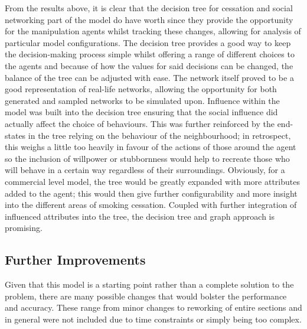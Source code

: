 \documentclass[]{report}
\begin{document}
From the results above, it is clear that the decision tree for cessation and social networking part of the model do have worth since they provide the opportunity for the manipulation agents whilst tracking these changes, allowing for analysis of particular model configurations. The decision tree provides a good way to keep the decision-making process simple whilst offering a range of different choices to the agents and because of how the values for said decisions can be changed, the balance of the tree can be adjusted with ease. The network itself proved to be a good representation of real-life networks, allowing the opportunity for both generated and sampled networks to be simulated upon. Influence within the model was built into the decision tree ensuring that the social influence did actually affect the choice of behaviours. This was further reinforced by the end-states in the tree relying on the behaviour of the neighbourhood; in retrospect, this weighs a little too heavily in favour of the actions of those around the agent so the inclusion of willpower or stubbornness would help to recreate those who will behave in a certain way regardless of their surroundings. Obviously, for a commercial level model, the tree would be greatly expanded with more attributes added to the agent; this would then give further configurability and more insight into the different areas of smoking cessation. Coupled with further integration of influenced attributes into the tree, the decision tree and graph approach is promising.

\subsection{Further Improvements}
Given that this model is a starting point rather than a complete solution to the problem, there are many possible changes that would bolster the performance and accuracy. These range from minor changes to reworking of entire sections and in general were not included due to time constraints or simply being too complex.
\end{document}
